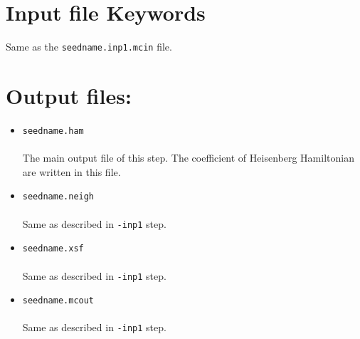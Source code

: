 \documentclass[10pt]{report}
\begin{document}
\section{Input file Keywords}
Same as the {\tt seedname.inp1.mcin} file.
\section{Output files:}
\begin{itemize}
\item {\tt seedname.ham}\\\\
The main output file of this step. The coefficient of Heisenberg Hamiltonian are written in this file.
\item {\tt seedname.neigh}\\\\
Same as described in {\tt -inp1} step.
\item {\tt seedname.xsf}\\\\
Same as described in {\tt -inp1} step.
\item {\tt seedname.mcout}\\\\
Same as described in {\tt -inp1} step.
\end{itemize}





\end{document}
